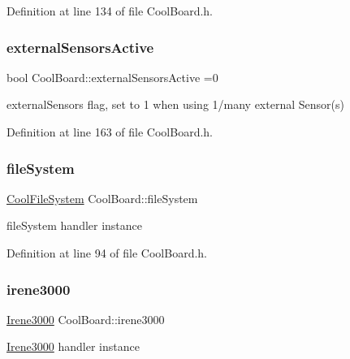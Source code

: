 Definition at line 134 of file Cool\+Board.\+h.

\mbox{\label{class_cool_board_a638b00b76aeb819ecfd4c10b8cdd7bb7}} 
\subsubsection{\texorpdfstring{external\+Sensors\+Active}{externalSensorsActive}}
{\footnotesize\ttfamily bool Cool\+Board\+::external\+Sensors\+Active =0\hspace{0.3cm}{\ttfamily [private]}}

external\+Sensors flag, set to 1 when using 1/many external Sensor(s) 

Definition at line 163 of file Cool\+Board.\+h.

\mbox{\label{class_cool_board_a42c2586fbb13ff7f06538e9284e8538d}} 
\subsubsection{\texorpdfstring{file\+System}{fileSystem}}
{\footnotesize\ttfamily \hyperlink{class_cool_file_system}{Cool\+File\+System} Cool\+Board\+::file\+System\hspace{0.3cm}{\ttfamily [private]}}

file\+System handler instance 

Definition at line 94 of file Cool\+Board.\+h.

\mbox{\label{class_cool_board_ad103718ce316006c4695b8eb312eaf11}} 
\subsubsection{\texorpdfstring{irene3000}{irene3000}}
{\footnotesize\ttfamily \hyperlink{class_irene3000}{Irene3000} Cool\+Board\+::irene3000\hspace{0.3cm}{\ttfamily [private]}}

\hyperlink{class_irene3000}{Irene3000} handler instance 

